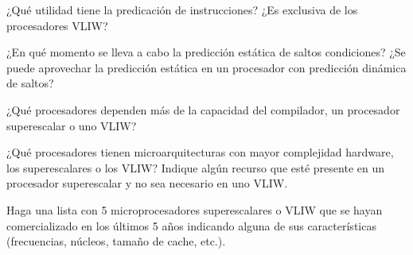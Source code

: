 \begin{cuestion}
    ¿Qué utilidad tiene la predicación de instrucciones? ¿Es exclusiva de los procesadores VLIW?
\end{cuestion}

\begin{cuestion}
¿En qué momento se lleva a cabo la predicción estática de saltos condiciones? ¿Se puede aprovechar la predicción estática en un procesador con predicción dinámica de saltos?
\end{cuestion}

\begin{cuestion}
    ¿Qué procesadores dependen más de la capacidad del compilador, un procesador superescalar o uno VLIW?
\end{cuestion}

\begin{cuestion}
    ¿Qué procesadores tienen microarquitecturas con mayor complejidad hardware, los superescalares o los VLIW\@? Indique algún recurso que esté presente en un procesador superescalar y no sea necesario en uno VLIW.

    Haga una lista con 5 microprocesadores superescalares o VLIW que se hayan comercializado en los últimos 5 años indicando alguna de sus características (frecuencias, núcleos, tamaño de cache, etc.).
\end{cuestion}
